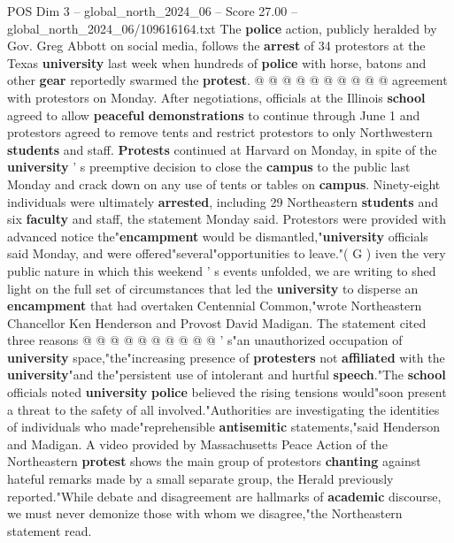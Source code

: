 \begin{textsample}{POS Dim 3 – global\_north\_2024\_06 – Score 27.00 – global\_north\_2024\_06/109616164.txt}
The \textbf{police} action, publicly heralded by Gov.
Greg Abbott on social media, follows the \textbf{arrest} of 34 protestors at the Texas \textbf{university} last week when hundreds of \textbf{police} with horse, batons and other \textbf{gear} reportedly swarmed the \textbf{protest}. @ @ @ @ @ @ @ @ @ @ agreement with protestors on Monday.
After negotiations, officials at the Illinois \textbf{school} agreed to allow \textbf{peaceful} \textbf{demonstrations} to continue through June 1 and protestors agreed to remove tents and restrict protestors to only Northwestern \textbf{students} and staff. \textbf{Protests} continued at Harvard on Monday, in spite of the \textbf{university} ' s preemptive decision to close the \textbf{campus} to the public last Monday and crack down on any use of tents or tables on \textbf{campus}.
Ninety-eight individuals were ultimately \textbf{arrested}, including 29 Northeastern \textbf{students} and six \textbf{faculty} and staff, the statement Monday said.
Protestors were provided with advanced notice the"\textbf{encampment} would be dismantled,"\textbf{university} officials said Monday, and were offered"several"opportunities to leave."( G ) iven the very public nature in which this weekend ' s events unfolded, we are writing to shed light on the full set of circumstances that led the \textbf{university} to disperse an \textbf{encampment} that had overtaken Centennial Common,"wrote Northeastern Chancellor Ken Henderson and Provost David Madigan.
The statement cited three reasons @ @ @ @ @ @ @ @ @ @ ' s"an unauthorized occupation of \textbf{university} space,"the"increasing presence of \textbf{protesters} not \textbf{affiliated} with the \textbf{university}"and the"persistent use of intolerant and hurtful \textbf{speech}."The \textbf{school} officials noted \textbf{university} \textbf{police} believed the rising tensions would"soon present a threat to the safety of all involved."Authorities are investigating the identities of individuals who made"reprehensible \textbf{antisemitic} statements,"said Henderson and Madigan.
A video provided by Massachusetts Peace Action of the Northeastern \textbf{protest} shows the main group of protestors \textbf{chanting} against hateful remarks made by a small separate group, the Herald previously reported."While debate and disagreement are hallmarks of \textbf{academic} discourse, we must never demonize those with whom we disagree,"the Northeastern statement read.

\end{textsample}
